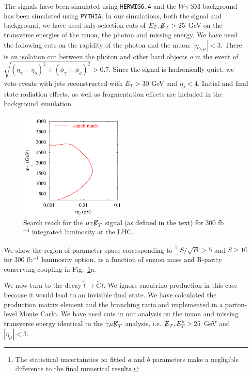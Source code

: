 \documentclass[11pt]{cernrep}
\begin{document}
The signals
have been simulated using {\small \tt HERWIG6.4} and
the $W \gamma$ SM background has been simulated
using {\small \tt PYTHIA}.
In our simulations, both the signal and background, we have used
only selection cuts of $E_T, {\not\!\!E}_{T} > 25$ GeV on the
transverse energies of the muon, the photon and missing energy.
We have used the following cuts
on the rapidity of the photon and the muon: $|\eta_{\gamma,\mu}|<3$.
There is an isolation cut between the photon and other hard objects
$o$ in the
event of $\sqrt{(\eta_\gamma - \eta_o)^2 + (\phi_\gamma - \phi_o)^2}>0.7$.
Since the signal is hadronically quiet, we veto events with jets
reconstructed with $E_T>30$ GeV and $\eta_j<4$. Initial and final state
radiation effects, as well as fragmentation effects are included in the
background simulation.
\begin{figure}
\begin{center}
\includegraphics[width=0.5\textwidth]{sample_fig1}
 \caption{Search reach for the $\mu \gamma {\not\!\!E}_{T}$ signal
(as defined in the
   text) for
   300 fb$^{-1}$ integrated luminosity  at the LHC.
}
\label{search}
\end{center}
\end{figure}
We show the region of parameter space corresponding to
\footnote{The
  statistical uncertainties
  on fitted $a$ and $b$ parameters make a negligible difference to the
final numerical results.} $S/\sqrt{B}>5$
and $S\geq10$
for 300 fb$^{-1}$ luminosity option, as a function of smuon mass
and R-parity conserving coupling in Fig.~\ref{search}a.

We now turn to the decay ${\tilde l} \rightarrow {\tilde G} l$. We ignore
sneutrino production in this case because it would lead to an invisible
final state. We have calculated the production matrix element and
the branching ratio and implemented in a parton-level Monte Carlo.
We have used cuts in our analysis on the muon and missing transverse
energy identical
to the $\gamma \mu {\not\!\!E}_{T}$ analysis, i.e.
${\not\!\!E}_{T},E_T^\mu>25$ GeV and $|\eta_\mu|<3$.
\end{document}
